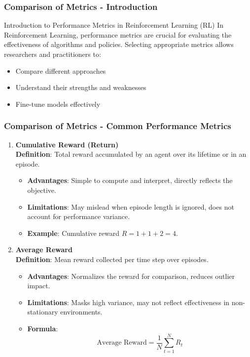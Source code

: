 \documentclass{beamer}
\begin{document}
\begin{frame}[fragile]
    \frametitle{Comparison of Metrics - Introduction}
    \begin{block}{Introduction to Performance Metrics in Reinforcement Learning (RL)}
        In Reinforcement Learning, performance metrics are crucial for evaluating the effectiveness of algorithms and policies. Selecting appropriate metrics allows researchers and practitioners to:
        \begin{itemize}
            \item Compare different approaches
            \item Understand their strengths and weaknesses
            \item Fine-tune models effectively
        \end{itemize}
    \end{block}
\end{frame}

\begin{frame}[fragile]
    \frametitle{Comparison of Metrics - Common Performance Metrics}
    \begin{enumerate}
        \item \textbf{Cumulative Reward (Return)} \\
        \textbf{Definition}: Total reward accumulated by an agent over its lifetime or in an episode.
        \begin{itemize}
            \item \textbf{Advantages}: Simple to compute and interpret, directly reflects the objective.
            \item \textbf{Limitations}: May mislead when episode length is ignored, does not account for performance variance.
            \item \textbf{Example}: Cumulative reward \( R = 1 + 1 + 2 = 4 \).
        \end{itemize}
        
        \item \textbf{Average Reward} \\
        \textbf{Definition}: Mean reward collected per time step over episodes.
        \begin{itemize}
            \item \textbf{Advantages}: Normalizes the reward for comparison, reduces outlier impact.
            \item \textbf{Limitations}: Masks high variance, may not reflect effectiveness in non-stationary environments.
            \item \textbf{Formula}: 
            \begin{equation}
            \text{Average Reward} = \frac{1}{N}\sum_{t=1}^N R_t
            \end{equation}
        \end{itemize}    
    \end{enumerate}
\end{frame}
\end{document}
